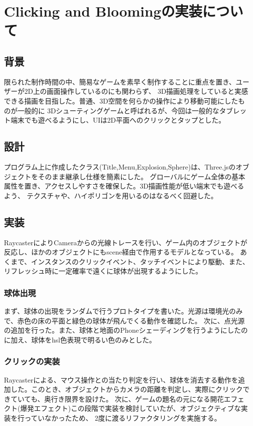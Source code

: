 \documentclass[10pt,a4j]{jreport}
\begin{document}
\chapter{Clicking and Bloomingの実装について}
\section{背景}
限られた制作時間の中、簡易なゲームを素早く制作することに重点を置き、ユーザーが2D上の画面操作しているのにも関わらず、
3D描画処理をしていると実感できる描画を目指した。普通、3D空間を何らかの操作により移動可能にしたものが一般的に
3Dシューティングゲームと呼ばれるが、今回は一般的なタブレット端末でも遊べるようにし、UIは2D平面へのクリックとタップとした。
\section{設計}
プログラム上に作成したクラス(Title,Menu,Explosion,Sphere)は、Three.jsのオブジェクトをそのまま継承し仕様を簡素にした。
グローバルにゲーム全体の基本属性を置き、アクセスしやすさを確保した。3D描画性能が低い端末でも遊べるよう、
テクスチャや、ハイポリゴンを用いるのはなるべく回避した。
\section{実装}
RaycasterによりCameraからの光線トレースを行い、ゲーム内のオブジェクトが反応し、ほかのオブジェクトにもscene経由で作用するモデルとなっている。
あくまで、インスタンスのクリックイベント、タッチイベントにより駆動、また、リフレッシュ時に一定確率で遠くに球体が出現するようにした。
\subsection{球体出現}
まず、球体の出現をランダムで行うプロトタイプを書いた。光源は環境光のみで、赤色の床の平面と緑色の球体が飛んでくる動作を確認した。
次に、点光源の追加を行った。また、球体と地面のPhoneシェーディングを行うようにしたのに加え、球体をhsl色表現で明るい色のみとした。
\subsection{クリックの実装}
Raycasterによる、マウス操作との当たり判定を行い、球体を消去する動作を追加した。このとき、オブジェクトからカメラの距離を判定し、実際にクリックできていても、奥行き限界を設けた。
次に、ゲームの題名の元になる開花エフェクト(爆発エフェクト)この段階で実装を検討していたが、オブジェクティブな実装を行っていなかったため、
2度に渡るリファクタリングを実施する。
\end{document}
